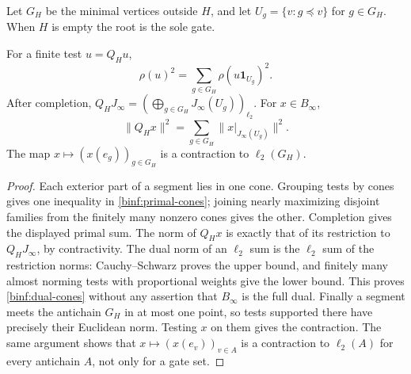 Let $G_H$ be the minimal vertices outside $H$, and let
$U_g=\{v:g\preceq v\}$ for $g\in G_H$. When $H$ is empty the
root is the sole gate.

\begin{lemma}\label{binf:cones}
For a finite test $u=Q_Hu$,
\begin{equation}\label{binf:primal-cones}
 \rho(u)^2=\sum_{g\in G_H}\rho(u\mathbf1_{U_g})^2.
\end{equation}
After completion,
$Q_HJ_\infty=(\bigoplus_{g\in G_H}J_\infty(U_g))_{\ell_2}$.
For $x\in B_\infty$,
\begin{equation}\label{binf:dual-cones}
 \|Q_Hx\|^2=\sum_{g\in G_H}\|x|_{J_\infty(U_g)}\|^2.
\end{equation}
The map $x\mapsto(x(e_g))_{g\in G_H}$ is a contraction to
$\ell_2(G_H)$.
\end{lemma}
\begin{proof}
Each exterior part of a segment lies in one cone. Grouping tests by
cones gives one inequality in \eqref{binf:primal-cones}; joining nearly
maximizing disjoint families from the finitely many nonzero cones gives
the other. Completion gives the displayed primal sum. The norm of
$Q_Hx$ is exactly that of its restriction to $Q_HJ_\infty$, by
contractivity. The dual norm of an $\ell_2$ sum is the $\ell_2$ sum
of the restriction norms: Cauchy--Schwarz proves the upper bound, and
finitely many almost norming tests with proportional weights give the
lower bound. This proves \eqref{binf:dual-cones} without any assertion
that $B_\infty$ is the full dual. Finally a segment meets the antichain
$G_H$ in at most one point, so tests supported there have precisely their
Euclidean norm. Testing $x$ on them gives the contraction. The same
argument shows that $x\mapsto(x(e_v))_{v\in A}$ is a contraction
to $\ell_2(A)$ for every antichain $A$, not only for a gate set.
\end{proof}

